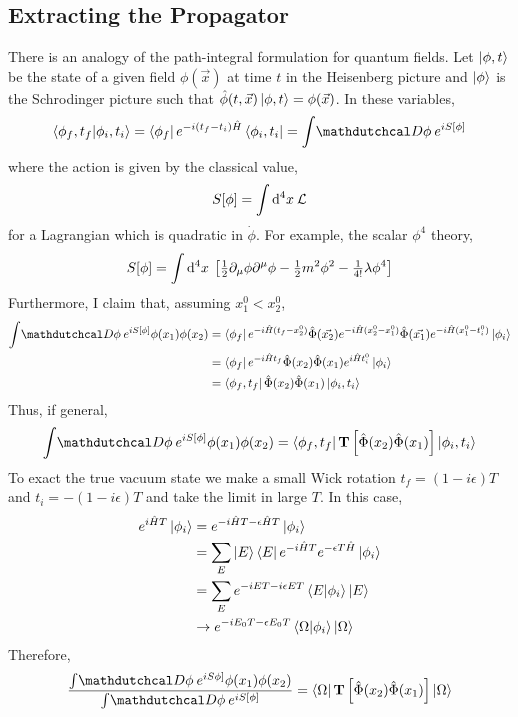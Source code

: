 \documentclass[12pt]{extarticle}
\begin{document}
\subsection{Extracting the Propagator}

There is an analogy of the path-integral formulation for quantum fields. Let $\left| \phi, t \right>$ be the state of a given  field $\phi(\vec{x})$ at time $t$ in the Heisenberg picture and $\left| \phi \right>$ is the Schrodinger picture such that $\hat{\phi}(t, \vec{x}) \left| \phi, t \right> = \phi(\vec{x})$. In these variables,
\[ \inner{\phi_f, t_f}{\phi_i, t_i} = \bra{\phi_f} e^{- i (t_f - t_i) \hamilt} \bra{\phi_i, t_i} = \int \pathd{\phi} e^{i S[\phi]} \]
where the action is given by the classical value,
\[ S[\phi] = \int \mathrm{d}^{4} x \: \mathcal{L} \]
for a Lagrangian which is quadratic in $\dot{\phi}$. For example, the scalar $\phi^4$ theory,
\[ S[\phi] = \int \mathrm{d}^{4} x \: \left[ \tfrac{1}{2} \partial_\mu \phi \partial^\mu \phi - \tfrac{1}{2} m^2 \phi^2 - \tfrac{1}{4!} \lambda \phi^4 \right] \]
Furthermore, I claim that, assuming $x_1^0 < x_2^0$,
\begin{align*}
\int \pathd{\phi} e^{i S[\phi] } \phi(x_1) \phi(x_2) & = \bra{\phi_f} e^{- i \hamilt ( t_f - x_2^0 )}  \field(\vec{x_2}) e^{- i \hamilt ( x_2^0 - x_1^0 )} \field(\vec{x_1}) e^{- i \hamilt ( x_1^0 - t_i^0 )}  \ket{\phi_i} 
\\
& = \bra{\phi_f} e^{- i \hamilt t_f}  \field(x_2) \field(x_1) e^{i \hamilt t_i^0 }  \ket{\phi_i} 
\\
& = \bra{\phi_f, t_f} \field(x_2) \field(x_1) \ket{\phi_i, t_i}
\end{align*}
Thus, if general,
\[ \int \pathd{\phi} e^{i S[\phi] } \phi(x_1) \phi(x_2) = \bra{\phi_f, t_f} \mathbf{T} \left[ \field(x_2) \field(x_1) \right] \ket{\phi_i, t_i} \]
To exact the true vacuum state we make a small Wick rotation $t_f = (1 - i \epsilon) T$ and $t_i = -(1 - i \epsilon) T$ and take the limit in large $T$. In this case,
\begin{align*} 
e^{i \hat{H} T} \left| \phi_i \right> & = e^{-i \hat{H} T - \epsilon \hat{H} T} \left| \phi_i \right> 
\\
& = \sum_E \left| E \right> \left< E \right| e^{-i \hat{H} T} e^{-\epsilon T \hat{H}} \left| \phi_i \right>
\\
& = \sum_E e^{- i E T - i \epsilon E T} \left< E | \phi_i \right> \left| E \right>
\\
& \rightarrow e^{- i E_0 T - \epsilon E_0 T} \left< \Omega | \phi_i \right> \left| \Omega \right>    
\end{align*}
Therefore,
\[ \frac{ \int \pathd{\phi} e^{i S\phi]} \phi(x_1) \phi(x_2) }{\int \pathd{\phi} e^{i S[\phi]}} = \bra{\Omega} \mathbf{T} \left[ \field(x_2) \field(x_1) \right] \ket{\Omega}  \] 
\end{document}
